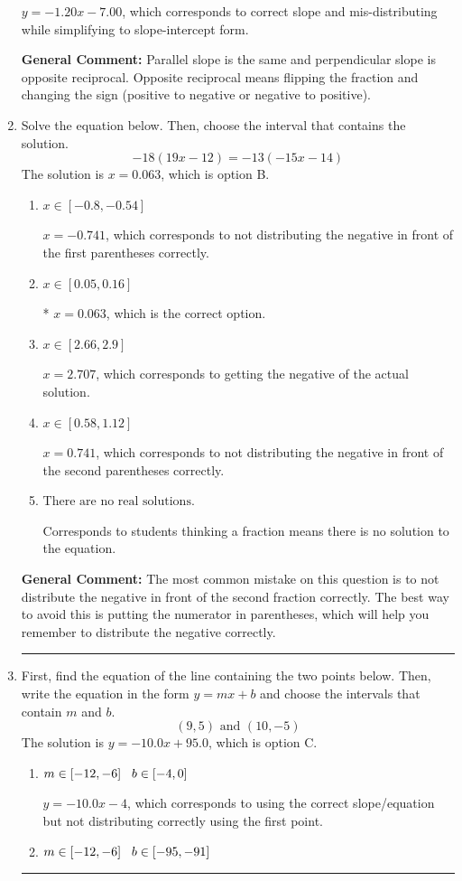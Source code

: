 \documentclass{extbook}[14pt]
\newcommand{\litem}[1]{\item #1

\rule{\textwidth}{0.4pt}}
\begin{document}
\begin{enumerate}
{\begin{enumerate}[label=\Alph*.]
 $y = -1.20x - 7.00$, which corresponds to correct slope and mis-distributing while simplifying to slope-intercept form.
\end{enumerate}

\textbf{General Comment:} Parallel slope is the same and perpendicular slope is opposite reciprocal. Opposite reciprocal means flipping the fraction and changing the sign (positive to negative or negative to positive).
}
\litem{
Solve the equation below. Then, choose the interval that contains the solution.
\[ -18(19x -12) = -13(-15x -14) \]The solution is \( x = 0.063 \), which is option B.\begin{enumerate}[label=\Alph*.]
\item \( x \in [-0.8, -0.54] \)

$x = -0.741$, which corresponds to not distributing the negative in front of the first parentheses correctly.
\item \( x \in [0.05, 0.16] \)

* $x = 0.063$, which is the correct option.
\item \( x \in [2.66, 2.9] \)

$x = 2.707$, which corresponds to getting the negative of the actual solution.
\item \( x \in [0.58, 1.12] \)

$x = 0.741$, which corresponds to not distributing the negative in front of the second parentheses correctly.
\item \( \text{There are no real solutions.} \)

Corresponds to students thinking a fraction means there is no solution to the equation.
\end{enumerate}

\textbf{General Comment:} The most common mistake on this question is to not distribute the negative in front of the second fraction correctly. The best way to avoid this is putting the numerator in parentheses, which will help you remember to distribute the negative correctly.
}
\litem{
First, find the equation of the line containing the two points below. Then, write the equation in the form $ y=mx+b $ and choose the intervals that contain $m$ and $b$.
\[ (9, 5) \text{ and } (10, -5) \]The solution is \( y = -10.0x + 95.0 \), which is option C.\begin{enumerate}[label=\Alph*.]
\item \( m \in [-12, -6] \hspace*{3mm} b \in [-4, 0] \)

 $y = -10.0x -4$, which corresponds to using the correct slope/equation but not distributing correctly using the first point.
\item \( m \in [-12, -6] \hspace*{3mm} b \in [-95, -91] \)


\end{enumerate}}
\end{enumerate}
\end{document}
